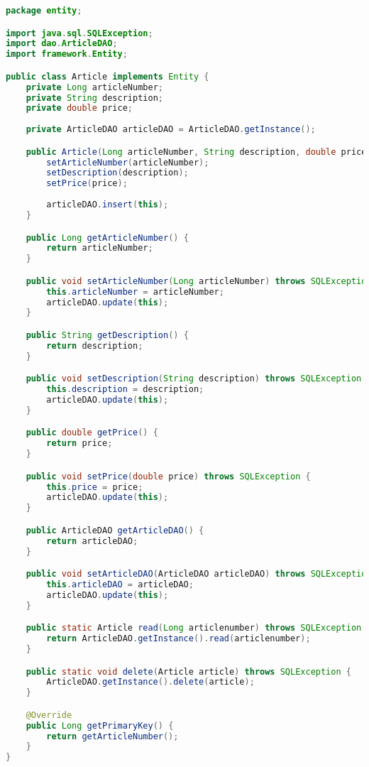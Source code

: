 \begin{lstlisting}[language=java, style=java, caption={Article.java},
label={lst:lst6}]
package entity;

import java.sql.SQLException;
import dao.ArticleDAO;
import framework.Entity;

public class Article implements Entity {
	private Long articleNumber;
	private String description;
	private double price;
	
	private ArticleDAO articleDAO = ArticleDAO.getInstance();

	public Article(Long articleNumber, String description, double price) throws SQLException {
		setArticleNumber(articleNumber);
		setDescription(description);
		setPrice(price);
		
		articleDAO.insert(this);
	}

	public Long getArticleNumber() {
		return articleNumber;
	}

	public void setArticleNumber(Long articleNumber) throws SQLException {
		this.articleNumber = articleNumber;
		articleDAO.update(this);
	}

	public String getDescription() {
		return description;
	}

	public void setDescription(String description) throws SQLException {
		this.description = description;
		articleDAO.update(this);
	}

	public double getPrice() {
		return price;
	}

	public void setPrice(double price) throws SQLException {
		this.price = price;
		articleDAO.update(this);
	}

	public ArticleDAO getArticleDAO() {
		return articleDAO;
	}

	public void setArticleDAO(ArticleDAO articleDAO) throws SQLException {
		this.articleDAO = articleDAO;
		articleDAO.update(this);
	}

	public static Article read(Long articlenumber) throws SQLException {
		return ArticleDAO.getInstance().read(articlenumber);
	}

	public static void delete(Article article) throws SQLException {
		ArticleDAO.getInstance().delete(article);
	}

	@Override
	public Long getPrimaryKey() {
		return getArticleNumber();
	}
}
\end{lstlisting}

